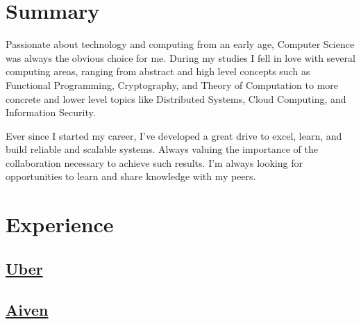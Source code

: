 \documentclass[11pt,a4paper,sans]{moderncv}
\begin{document}
\makecvtitle

\section{Summary}{
  Passionate about technology and computing from an early age, Computer Science
  was always the obvious choice for me. During my studies I fell in love with
  several computing areas, ranging from abstract and high level concepts such as
  Functional Programming, Cryptography, and Theory of Computation to more
  concrete and lower level topics like Distributed Systems, Cloud Computing, and
  Information Security.

  Ever since I started my career, I've developed a great drive to excel, learn,
  and build reliable and scalable systems. Always valuing the importance of the
  collaboration necessary to achieve such results. I'm always looking for
  opportunities to learn and share knowledge with my peers.
}


\section{Experience}

\subsection{\href{https://www.uber.com/}{Uber}}


\subsection{\href{https://aiven.io/}{Aiven}}

\end{document}
